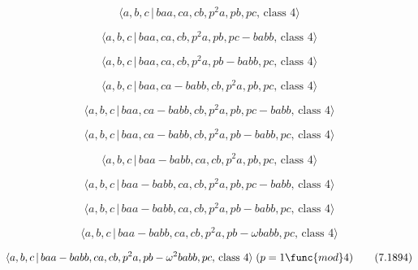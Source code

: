 \documentclass[10pt]{article}
\begin{document}
\begin{equation}
\langle a,b,c\,|\,baa,ca,cb,p^2a,pb,pc,\,\text{class }4\rangle  \tag{7.1884}
\end{equation}

\begin{equation}
\langle a,b,c\,|\,baa,ca,cb,p^2a,pb,pc-babb,\,\text{class }4\rangle 
\tag{7.1885}
\end{equation}

\begin{equation}
\langle a,b,c\,|\,baa,ca,cb,p^2a,pb-babb,pc,\,\text{class }4\rangle 
\tag{7.1886}
\end{equation}

\begin{equation}
\langle a,b,c\,|\,baa,ca-babb,cb,p^2a,pb,pc,\,\text{class }4\rangle 
\tag{7.1887}
\end{equation}

\begin{equation}
\langle a,b,c\,|\,baa,ca-babb,cb,p^2a,pb,pc-babb,\,\text{class }4\rangle 
\tag{7.1888}
\end{equation}

\begin{equation}
\langle a,b,c\,|\,baa,ca-babb,cb,p^2a,pb-babb,pc,\,\text{class }4\rangle 
\tag{7.1889}
\end{equation}

\begin{equation}
\langle a,b,c\,|\,baa-babb,ca,cb,p^2a,pb,pc,\,\text{class }4\rangle 
\tag{7.1890}
\end{equation}

\begin{equation}
\langle a,b,c\,|\,baa-babb,ca,cb,p^2a,pb,pc-babb,\,\text{class }4\rangle 
\tag{7.1891}
\end{equation}

\begin{equation}
\langle a,b,c\,|\,baa-babb,ca,cb,p^2a,pb-babb,pc,\,\text{class }4\rangle 
\tag{7.1892}
\end{equation}

\begin{equation}
\langle a,b,c\,|\,baa-babb,ca,cb,p^{2}a,pb-\omega babb,pc,\,\text{class }%
4\rangle  \tag{7.1893}
\end{equation}

\begin{equation}
\langle a,b,c\,|\,baa-babb,ca,cb,p^{2}a,pb-\omega ^{2}babb,pc,\,\text{class }%
4\rangle \;(p=1\func{mod}4)  \tag{7.1894}
\end{equation}
\end{document}
